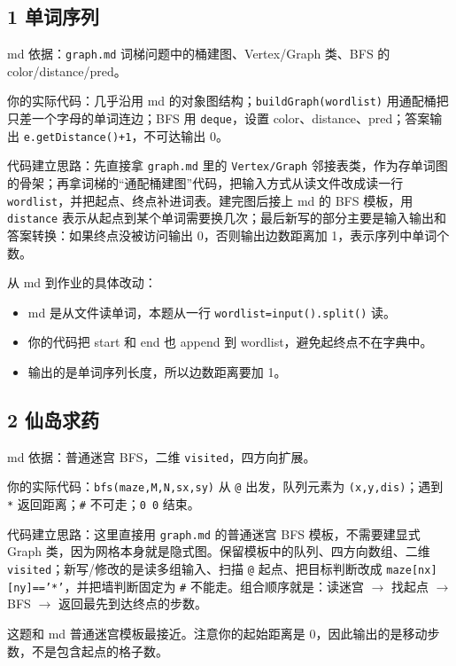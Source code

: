 \documentclass[10pt,a4paper,fontset=none]{ctexart}
\begin{document}
\subsection{1 单词序列}
\begin{sourcebox}
md 依据：\texttt{graph.md} 词梯问题中的桶建图、Vertex/Graph 类、BFS 的 color/distance/pred。
\end{sourcebox}
\begin{methodbox}
你的实际代码：几乎沿用 md 的对象图结构；\texttt{buildGraph(wordlist)} 用通配桶把只差一个字母的单词连边；BFS 用 \texttt{deque}，设置 color、distance、pred；答案输出 \texttt{e.getDistance()+1}，不可达输出 0。

代码建立思路：先直接拿 \texttt{graph.md} 里的 \texttt{Vertex/Graph} 邻接表类，作为存单词图的骨架；再拿词梯的“通配桶建图”代码，把输入方式从读文件改成读一行 \texttt{wordlist}，并把起点、终点补进词表。建完图后接上 md 的 BFS 模板，用 \texttt{distance} 表示从起点到某个单词需要换几次；最后新写的部分主要是输入输出和答案转换：如果终点没被访问输出 0，否则输出边数距离加 1，表示序列中单词个数。
\end{methodbox}
从 md 到作业的具体改动：
\begin{itemize}
  \item md 是从文件读单词，本题从一行 \texttt{wordlist=input().split()} 读。
  \item 你的代码把 start 和 end 也 append 到 wordlist，避免起终点不在字典中。
  \item 输出的是单词序列长度，所以边数距离要加 1。
\end{itemize}

\subsection{2 仙岛求药}
\begin{sourcebox}
md 依据：普通迷宫 BFS，二维 \texttt{visited}，四方向扩展。
\end{sourcebox}
\begin{methodbox}
你的实际代码：\texttt{bfs(maze,M,N,sx,sy)} 从 \texttt{@} 出发，队列元素为 \texttt{(x,y,dis)}；遇到 \texttt{*} 返回距离；\texttt{\#} 不可走；\texttt{0 0} 结束。

代码建立思路：这里直接用 \texttt{graph.md} 的普通迷宫 BFS 模板，不需要建显式 Graph 类，因为网格本身就是隐式图。保留模板中的队列、四方向数组、二维 \texttt{visited}；新写/修改的是读多组输入、扫描 \texttt{@} 起点、把目标判断改成 \texttt{maze[nx][ny]=='*'}，并把墙判断固定为 \texttt{\#} 不能走。组合顺序就是：读迷宫 $\rightarrow$ 找起点 $\rightarrow$ BFS $\rightarrow$ 返回最先到达终点的步数。
\end{methodbox}
这题和 md 普通迷宫模板最接近。注意你的起始距离是 0，因此输出的是移动步数，不是包含起点的格子数。
\end{document}

